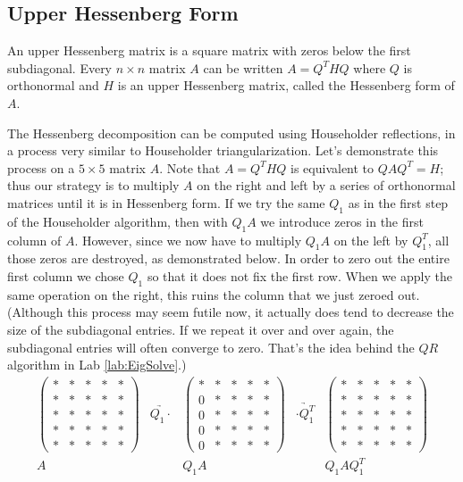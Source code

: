 \subsection*{Upper Hessenberg Form}
An upper Hessenberg matrix is a square matrix with zeros below the first subdiagonal.
Every  $n \times n$ matrix $A$ can be written $A = Q^THQ$ where $Q$ is orthonormal and $H$ is an upper Hessenberg matrix, called the Hessenberg form of $A$.

The Hessenberg decomposition can be computed using Householder reflections, in a process very similar to Householder triangularization.
Let's demonstrate this process on a $5 \times 5$ matrix $A$.
Note that $A=Q^THQ$ is equivalent to $QAQ^T = H$; thus our strategy is to multiply $A$ on the right and left by a series of orthonormal matrices until it is in Hessenberg form.
If we try the same $Q_1$ as in the first step of the Householder algorithm, then with $Q_1 A$ we introduce zeros in the first column of $A$.
However, since we now have to multiply $Q_1 A$ on the left by $Q_1^T$, all those zeros are destroyed, as demonstrated below.
In order to zero out the entire first column we chose $Q_1$ so that it does not fix the first row.
When we apply the same operation on the right, this ruins the column that we just zeroed out.
(Although this process may seem futile now, it actually does tend to decrease the size of the subdiagonal entries.
If we repeat it over and over again, the subdiagonal entries will often converge to zero.
That's the idea behind the $QR$ algorithm in Lab \ref{lab:EigSolve}.)
\[
\begin{array}{ccccc}
\begin{pmatrix}
* & * & * & * & * \\
* & * & * & * & * \\
* & * & * & * & * \\
* & * & * & * & * \\
* & * & * & * & *
\end{pmatrix}
&\underrightarrow{Q_1 \cdot }&
\begin{pmatrix}
* & * & * & * & * \\
0 & * & * & * & * \\
0 & * & * & * & * \\
0 & * & * & * & * \\
0 & * & * & * & *
\end{pmatrix}
&\underrightarrow{\cdot Q_1^T }&
\begin{pmatrix}
* & * & * & * & * \\
* & * & * & * & * \\
* & * & * & * & * \\
* & * & * & * & * \\
* & * & * & * & *
\end{pmatrix}
\\
A & & Q_1A & & Q_1 A Q_1^T
  \end{array}
\]
